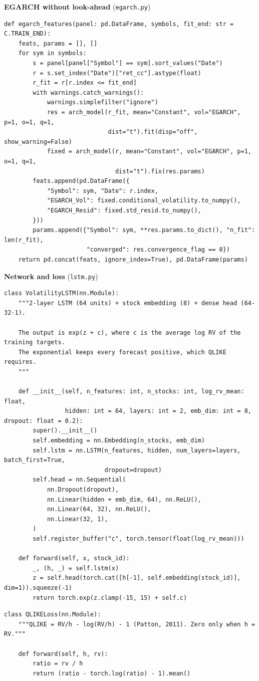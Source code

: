 \documentclass[11pt,a4paper]{article}
\begin{document}
\textbf{EGARCH without look-ahead} (\texttt{egarch.py})
\begin{lstlisting}
def egarch_features(panel: pd.DataFrame, symbols, fit_end: str = C.TRAIN_END):
    feats, params = [], []
    for sym in symbols:
        s = panel[panel["Symbol"] == sym].sort_values("Date")
        r = s.set_index("Date")["ret_cc"].astype(float)
        r_fit = r[r.index <= fit_end]
        with warnings.catch_warnings():
            warnings.simplefilter("ignore")
            res = arch_model(r_fit, mean="Constant", vol="EGARCH", p=1, o=1, q=1,
                             dist="t").fit(disp="off", show_warning=False)
            fixed = arch_model(r, mean="Constant", vol="EGARCH", p=1, o=1, q=1,
                               dist="t").fix(res.params)
        feats.append(pd.DataFrame({
            "Symbol": sym, "Date": r.index,
            "EGARCH_Vol": fixed.conditional_volatility.to_numpy(),
            "EGARCH_Resid": fixed.std_resid.to_numpy(),
        }))
        params.append({"Symbol": sym, **res.params.to_dict(), "n_fit": len(r_fit),
                       "converged": res.convergence_flag == 0})
    return pd.concat(feats, ignore_index=True), pd.DataFrame(params)
\end{lstlisting}

\textbf{Network and loss} (\texttt{lstm.py})
\begin{lstlisting}
class VolatilityLSTM(nn.Module):
    """2-layer LSTM (64 units) + stock embedding (8) + dense head (64-32-1).

    The output is exp(z + c), where c is the average log RV of the training targets.
    The exponential keeps every forecast positive, which QLIKE requires.
    """

    def __init__(self, n_features: int, n_stocks: int, log_rv_mean: float,
                 hidden: int = 64, layers: int = 2, emb_dim: int = 8, dropout: float = 0.2):
        super().__init__()
        self.embedding = nn.Embedding(n_stocks, emb_dim)
        self.lstm = nn.LSTM(n_features, hidden, num_layers=layers, batch_first=True,
                            dropout=dropout)
        self.head = nn.Sequential(
            nn.Dropout(dropout),
            nn.Linear(hidden + emb_dim, 64), nn.ReLU(),
            nn.Linear(64, 32), nn.ReLU(),
            nn.Linear(32, 1),
        )
        self.register_buffer("c", torch.tensor(float(log_rv_mean)))

    def forward(self, x, stock_id):
        _, (h, _) = self.lstm(x)
        z = self.head(torch.cat([h[-1], self.embedding(stock_id)], dim=1)).squeeze(-1)
        return torch.exp(z.clamp(-15, 15) + self.c)
\end{lstlisting}
\begin{lstlisting}
class QLIKELoss(nn.Module):
    """QLIKE = RV/h - log(RV/h) - 1 (Patton, 2011). Zero only when h = RV."""

    def forward(self, h, rv):
        ratio = rv / h
        return (ratio - torch.log(ratio) - 1).mean()
\end{lstlisting}
\end{document}
